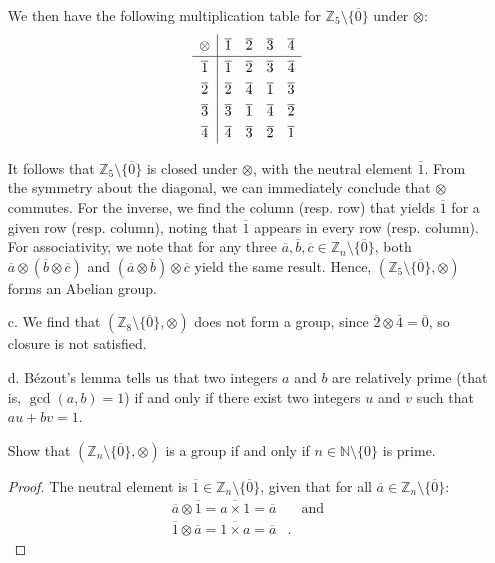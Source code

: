 \documentclass[11pt]{article}
\newcommand{\Z}{\mathbb{Z}}
\newcommand{\N}{\mathbb{N}}
\newcommand{\cls}[1]{\overline{#1}}                      %
\theoremstyle{definition}
\theoremstyle{plain}
\theoremstyle{remark}
\begin{document}
\begin{enumerate}
          We then have the following multiplication table for $\Z_5 \setminus \{\cls{0}\}$ under $\otimes$:
          \[
              \begingroup
              \renewcommand{\arraystretch}{1.3}
              \begin{array}{c|ccccc}
                  \otimes & \cls{1} & \cls{2} & \cls{3} & \cls{4} \\
                  \hline
                  \cls{1} & \cls{1} & \cls{2} & \cls{3} & \cls{4} \\
                  \cls{2} & \cls{2} & \cls{4} & \cls{1} & \cls{3} \\
                  \cls{3} & \cls{3} & \cls{1} & \cls{4} & \cls{2} \\
                  \cls{4} & \cls{4} & \cls{3} & \cls{2} & \cls{1} \\
              \end{array}
              \endgroup
          \]

          It follows that $\Z_5 \setminus \{\cls{0}\}$ is closed under $\otimes$, with the neutral element $\cls{1}$.
          From the symmetry about the diagonal, we can immediately conclude that $\otimes$ commutes.  For the inverse,
          we find the column (resp. row) that yields $\cls{1}$ for a given row (resp. column), noting that $\cls{1}$
          appears in every row (resp. column).  For associativity, we note that for any three $\cls{a}, \cls{b}, \cls{c}
              \in \Z_n \setminus \{\cls{0}\}$, both $\cls{a} \otimes (\cls{b} \otimes \cls{c})$ and $(\cls{a} \otimes
              \cls{b}) \otimes \cls{c}$ yield the same result.  Hence, $(\Z_5 \setminus \{\cls{0}\}, \otimes)$ forms an
          Abelian group.

    \item[c.] We find that $(\Z_8 \setminus \{\cls{0}\}, \otimes)$ does not form a group, since $ \cls{2} \otimes
              \cls{4} = \cls{0} $, so closure is not satisfied.

    \item[d.] Bézout's lemma tells us that two integers $a$ and $b$ are relatively prime (that is, $\gcd(a, b) = 1$) if
          and only if there exist two integers $u$ and $v$ such that $au + bv = 1$.

          Show that $(\Z_n \setminus \{\cls{0}\}, \otimes)$ is a group if and only if $n \in \N \setminus \{0\}$ is
          prime.

          \begin{proof}[Proof]
              The neutral element is $\cls{1} \in \Z_n \setminus \{\cls{0}\}$, given that for all $\cls{a} \in \Z_n
                  \setminus \{\cls{0}\}$:
              \[
                  \begin{aligned}
                      \cls{a} \otimes \cls{1} = \cls{a \times 1} = \cls{a} & \quad \textrm{and} \\
                      \cls{1} \otimes \cls{a} = \cls{1 \times a} = \cls{a} & .
                  \end{aligned}
              \]


\end{proof}
\end{enumerate}
\end{document}
